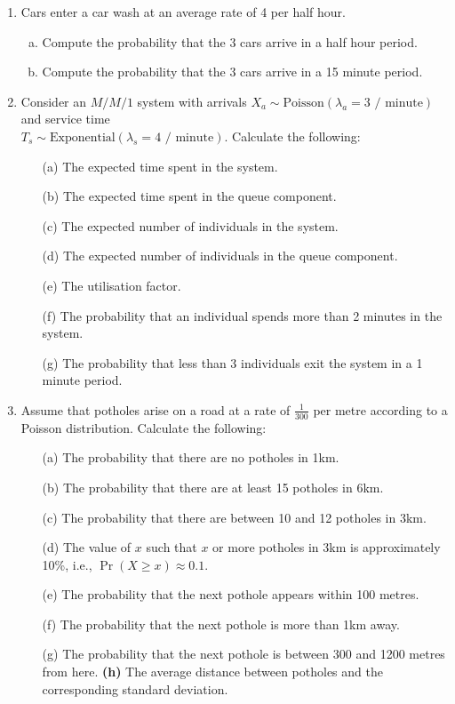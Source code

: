 \documentclass[a4paper,12pt]{article}
\begin{document}
\begin{enumerate}
    \item 
Cars enter a car wash at an average rate of 4 per half hour. 
\begin{enumerate}[(a)]
    \item Compute the probability that the 3 cars arrive in a half hour period.
\item Compute the probability that the 3 cars arrive in a 15 minute period.
\end{enumerate}

\item 
Consider an $M/M/1$ system with arrivals $X_a \sim \text{Poisson}(\lambda_a=3 \text{ / minute})$ and service time \\$T_s \sim \text{Exponential}(\lambda_s=4 \text{ / minute})$. Calculate the following:\\[-0.2cm]
\begin{itemize}
\item[(a)] The expected time spent in the system.  \item[(b)] The expected time spent in the queue component.  \item[(c)] The expected number of individuals in the system.   \item[(d)] The expected number of individuals in the queue component.  \item[(e)] The utilisation factor.  \item[(f)] The probability that an individual spends more than 2 minutes in the system.  \item[(g)] The probability that less than 3 individuals exit the system in a 1 minute period.
\end{itemize}


\item 
Assume that potholes arise on a road at a rate of  $\frac{1}{300}$ per metre according to a Poisson distribution. Calculate the following:\\[-0.2cm]

\begin{itemize}
\item[(a)] The probability that there are no potholes in 1km.  \item[(b)] The probability that there are at least 15 potholes in 6km.  \item[(c)] The probability that there are between 10 and 12 potholes in 3km.   \item[(d)] The value of $x$ such that $x$ or more potholes in 3km is approximately 10\%, i.e., $\Pr(X \ge x) \approx 0.1$.    \item[(e)] The probability that the next pothole appears within 100 metres.  \item[(f)] The probability that the next pothole is more than 1km away.  \item[(g)] The probability that the next pothole is between 300 and 1200 metres from here.   {\bf(h)} The average distance between potholes and the corresponding standard deviation.


\end{itemize}
\end{enumerate}
\end{document}

